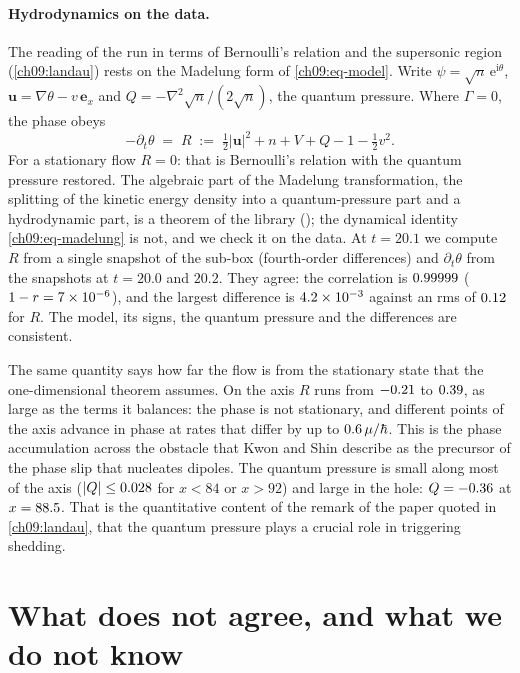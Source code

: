 \paragraph{Hydrodynamics on the data.} The reading of the run in terms of Bernoulli's relation and the supersonic region (\cref{ch09:landau}) rests on the Madelung form of \eqref{ch09:eq-model}. Write $\psi=\sqrt n\,\mathrm e^{\mathrm i\theta}$, $\mathbf u=\nabla\theta-v\,\mathbf e_x$ and $Q=-\nabla^2\!\sqrt n/(2\sqrt n)$, the quantum pressure. Where $\Gamma=0$, the phase obeys
\begin{equation}\label{ch09:eq-madelung}
-\partial_t\theta\;=\;R\;:=\;\tfrac12|\mathbf u|^2+n+V+Q-1-\tfrac12v^2 .
\end{equation}
For a stationary flow $R=0$: that is Bernoulli's relation with the quantum pressure restored. The algebraic part of the Madelung transformation, the splitting of the kinetic energy density into a quantum-pressure part and a hydrodynamic part, is a theorem of the library (); the dynamical identity \eqref{ch09:eq-madelung} is not, and we check it on the data. At $t=20.1$ we compute $R$ from a single snapshot of the sub-box (fourth-order differences) and $\partial_t\theta$ from the snapshots at $t=20.0$ and $20.2$. They agree: the correlation is $0.99999$ ($1-r=7\times10^{-6}$), and the largest difference is $4.2\times10^{-3}$ against an rms of $0.12$ for $R$. The model, its signs, the quantum pressure and the differences are consistent.

The same quantity says how far the flow is from the stationary state that the one-dimensional theorem assumes. On the axis $R$ runs from $-0.21$ to $0.39$, as large as the terms it balances: the phase is not stationary, and different points of the axis advance in phase at rates that differ by up to $0.6\,\mu/\hbar$. This is the phase accumulation across the obstacle that Kwon and Shin describe as the precursor of the phase slip that nucleates dipoles. The quantum pressure is small along most of the axis ($|Q|\le0.028$ for $x<84$ or $x>92$) and large in the hole: $Q=-0.36$ at $x=88.5$. That is the quantitative content of the remark of the paper quoted in \cref{ch09:landau}, that the quantum pressure plays a crucial role in triggering shedding.

\section{What does not agree, and what we do not know}\label{ch09:gaps}

